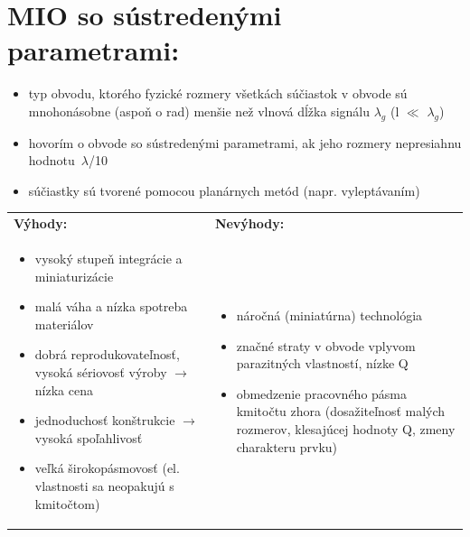 	\section{MIO so sústredenými parametrami:} \label{tema:MIO_sus_param}
	\begin{itemize}[label=--]
		\item typ obvodu, ktorého fyzické rozmery všetkách súčiastok v obvode sú mnohonásobne (aspoň o rad) menšie než vlnová dĺžka signálu $\lambda_g$ (l $\ll$ $\lambda_g$)
		\item hovorím o obvode so sústredenými parametrami, ak jeho rozmery nepresiahnu hodnotu~$\lambda$/10
		\item súčiastky sú tvorené pomocou planárnych metód (napr. vyleptávaním)
	\end{itemize}
	
	\begin{tabular}{p{8cm} p{8cm}}
		
		\textbf{Výhody:} & \textbf{Nevýhody:} \\
		
		\begin{minipage}[t]{8cm}
			\begin{itemize}[label=$\oplus$]
				\item vysoký stupeň integrácie a miniaturizácie 
				\item malá váha a nízka spotreba materiálov
				\item dobrá reprodukovateľnosť, vysoká sériovosť výroby $\rightarrow$ nízka cena
				\item jednoduchosť konštrukcie $\rightarrow$ vysoká spoľahlivosť
				\item veľká širokopásmovosť (el. vlastnosti sa neopakujú s kmitočtom)
			\end{itemize}
		\end{minipage}
		&
		\begin{minipage}[t]{8cm}
			\begin{itemize}[label=$\ominus$]
				\item náročná (miniatúrna) technológia
				\item značné straty v obvode vplyvom parazitných vlastností, nízke Q
				\item obmedzenie pracovného pásma kmitočtu zhora (dosažiteľnosť malých rozmerov, klesajúcej hodnoty Q, zmeny charakteru prvku)
			\end{itemize}
		\end{minipage}
	\end{tabular}
	
